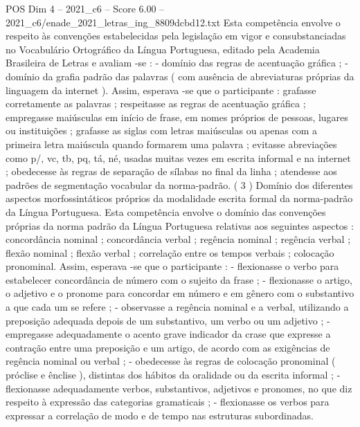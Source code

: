 \begin{textsample}{POS Dim 4 – 2021\_c6 – Score 6.00 – 2021\_c6/enade\_2021\_letras\_ing\_8809dcbd12.txt}
Esta competência envolve o respeito às convenções estabelecidas pela legislação em vigor e consubstanciadas no Vocabulário Ortográfico da Língua Portuguesa, editado pela Academia Brasileira de Letras e avaliam -se : - domínio das regras de acentuação gráfica ; - domínio da grafia padrão das palavras ( com ausência de abreviaturas próprias da linguagem da internet ).
Assim, esperava -se que o participante : grafasse corretamente as palavras ; respeitasse as regras de acentuação gráfica ; empregasse maiúsculas em início de frase, em nomes próprios de pessoas, lugares ou instituições ; grafasse as siglas com letras maiúsculas ou apenas com a primeira letra maiúscula quando formarem uma palavra ; evitasse abreviações como p/, vc, tb, pq, tá, né, usadas muitas vezes em escrita informal e na internet ; obedecesse às regras de separação de sílabas no final da linha ; atendesse aos padrões de segmentação vocabular da norma-padrão. ( 3 ) Domínio dos diferentes aspectos morfossintáticos próprios da modalidade escrita formal da norma-padrão da Língua Portuguesa.
Esta competência envolve o domínio das convenções próprias da norma padrão da Língua Portuguesa relativas aos seguintes aspectos : concordância nominal ; concordância verbal ; regência nominal ; regência verbal ; flexão nominal ; flexão verbal ; correlação entre os tempos verbais ; colocação pronominal.
Assim, esperava -se que o participante : - flexionasse o verbo para estabelecer concordância de número com o sujeito da frase ; - flexionasse o artigo, o adjetivo e o pronome para concordar em número e em gênero com o substantivo a que cada um se refere ; - observasse a regência nominal e a verbal, utilizando a preposição adequada depois de um substantivo, um verbo ou um adjetivo ; - empregasse adequadamente o acento grave indicador da crase que expresse a contração entre uma preposição e um artigo, de acordo com as exigências de regência nominal ou verbal ; - obedecesse às regras de colocação pronominal ( próclise e ênclise ), distintas dos hábitos da oralidade ou da escrita informal ; - flexionasse adequadamente verbos, substantivos, adjetivos e pronomes, no que diz respeito à expressão das categorias gramaticais ; - flexionasse os verbos para expressar a correlação de modo e de tempo nas estruturas subordinadas.

\end{textsample}
